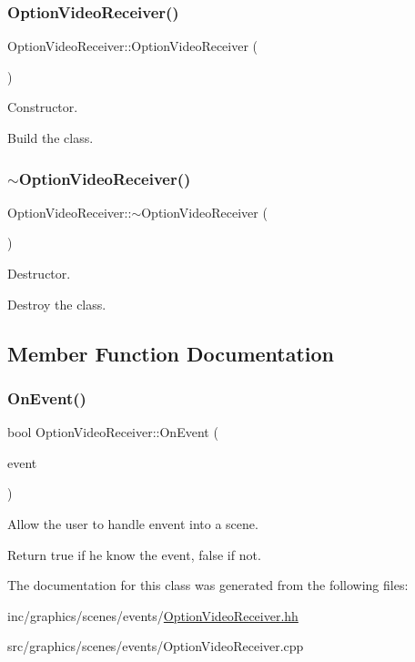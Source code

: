 \subsubsection{\texorpdfstring{Option\+Video\+Receiver()}{OptionVideoReceiver()}}
{\footnotesize\ttfamily Option\+Video\+Receiver\+::\+Option\+Video\+Receiver (\begin{DoxyParamCaption}{ }\end{DoxyParamCaption})}



Constructor. 

Build the class. \mbox{\label{classOptionVideoReceiver_ab014b77305c68f220fa5a0c8e9e57cb9}} 
\subsubsection{\texorpdfstring{$\sim$\+Option\+Video\+Receiver()}{~OptionVideoReceiver()}}
{\footnotesize\ttfamily Option\+Video\+Receiver\+::$\sim$\+Option\+Video\+Receiver (\begin{DoxyParamCaption}{ }\end{DoxyParamCaption})}



Destructor. 

Destroy the class. 

\subsection{Member Function Documentation}
\mbox{\label{classOptionVideoReceiver_a203025900c489eb2df12a6b3471c3caa}} 
\subsubsection{\texorpdfstring{On\+Event()}{OnEvent()}}
{\footnotesize\ttfamily bool Option\+Video\+Receiver\+::\+On\+Event (\begin{DoxyParamCaption}\item[{const irr\+::\+S\+Event \&}]{event }\end{DoxyParamCaption})}



Allow the user to handle envent into a scene. 

Return true if he know the event, false if not. 

The documentation for this class was generated from the following files\+:\begin{DoxyCompactItemize}
\item 
inc/graphics/scenes/events/\hyperlink{OptionVideoReceiver_8hh}{Option\+Video\+Receiver.\+hh}\item 
src/graphics/scenes/events/Option\+Video\+Receiver.\+cpp\end{DoxyCompactItemize}
